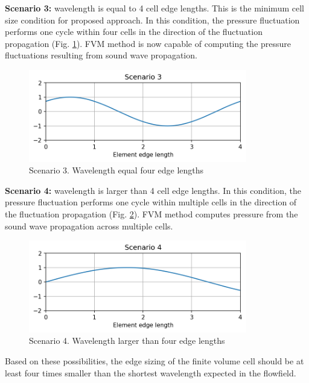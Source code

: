 \textbf{Scenario 3:} wavelength is equal to 4 cell edge lengths. This is the minimum cell size condition for proposed approach. In this condition, the pressure fluctuation performs one cycle within four cells in the direction of the fluctuation propagation (Fig. \ref{scen3}). FVM method is now capable of computing the pressure fluctuations resulting from sound wave propagation.

\begin{figure}[h!]
\centering %
\includegraphics[width=0.85\textwidth]{Pictures/case3.png}
\caption{Scenario 3. Wavelength equal four edge lengths}
\label{scen3}
\end{figure}

\textbf{Scenario 4:} wavelength is larger than 4 cell edge lengths. In this condition, the pressure fluctuation performs one cycle within multiple cells in the direction of the fluctuation propagation (Fig. \ref{scen4}). FVM method computes pressure from the sound wave propagation across multiple cells.

\begin{figure}[h!]
\centering %
\includegraphics[width=0.85\textwidth]{Pictures/case4.png}
\caption{Scenario 4. Wavelength larger than four edge lengths}
\label{scen4}
\end{figure}

Based on these possibilities, the edge sizing of the finite volume cell should be at least four times smaller than the shortest wavelength expected in the flowfield.

